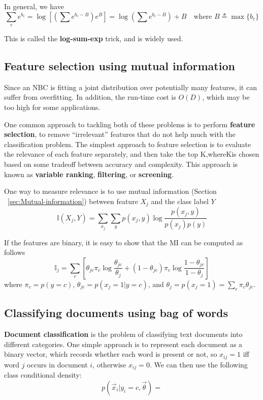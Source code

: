 In general, we have
\begin{equation}
\sum\limits_{c}e^{b_{c}}=\log\left[(\sum e^{b_c-B})e^B\right]=\log\left(\sum e^{b_c-B}\right)+B \quad \text{where } B \triangleq \max\{b_c\}
\end{equation}

This is called the \textbf{log-sum-exp} trick, and is widely used. 


\subsection{Feature selection using mutual information}
Since an NBC is fitting a joint distribution over potentially many features, it can suffer from overfitting. In addition, the run-time cost is $O(D)$, which may be too high for some applications. 

One common approach to tackling both of these problems is to perform \textbf{feature selection}, to remove “irrelevant” features that do not help much with the classification problem. The simplest approach to feature selection is to evaluate the relevance of each feature separately, and then take the top K,whereKis chosen based on some tradeoff between accuracy and complexity. This approach is known as \textbf{variable ranking}, \textbf{filtering}, or \textbf{screening}.

One way to measure relevance is to use mutual information (Section ~\ref{sec:Mutual-information}) between feature $X_j$ and the class label $Y$
\begin{equation}
\mathbb{I}(X_j,Y)=\sum\limits_{x_j}{\sum\limits_{y}{p(x_j,y)\log \dfrac{p(x_j,y)}{p(x_j)p(y)}}}
\end{equation}

If the features are binary, it is easy to show that the MI can be computed as follows
\begin{equation}
\mathbb{I}_j = \sum\limits_c \left[\theta_{jc}\pi_c\log{\dfrac{\theta_{jc}}{\theta_j}}+(1-\theta_{jc})\pi_c\log{\dfrac{1-\theta_{jc}}{1-\theta_j}}\right]
\end{equation}
where $\pi_c=p(y=c)$, $\theta_{jc}=p(x_j=1|y=c)$, and $\theta_j=p(x_j=1)=\sum_{c} \pi_c\theta_{jc}$.


\subsection{Classifying documents using bag of words}
\textbf{Document classification} is the problem of classifying text documents into different categories. One simple approach is to represent each document as a binary vector, which records whether each word is present or not, so $x_{ij} =1$ iff word $j$ occurs in document $i$, otherwise $x_{ij}=0$. We can then use the following class conditional density:
\begin{equation}
p(\vec{x}_i|y_i=c,\vec{\theta})=
\end{equation}


